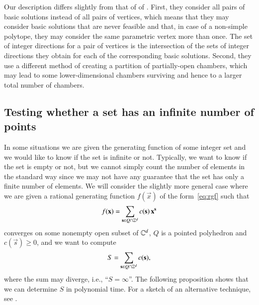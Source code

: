 Our description differs slightly from that of
of .
First, they consider all pairs of basic solutions instead
of all pairs of vertices, which means that they may
consider basic solutions that are never feasible and that,
in case of a non-simple polytope,
they may consider the same parametric vertex more than once.
The set of integer
directions for a pair of vertices is the intersection of
the sets of integer directions they obtain for each of
the corresponding basic solutions.
Second, they use a different method of creating a partition
of partially-open chambers, which may lead to some lower-dimensional
chambers surviving and hence to a larger total number of chambers.


\subsection{Testing whether a set has an infinite number of points}
\label{s:infinite}

In some situations we are given the generating function of
some integer set and we would like to know if the set is
infinite or not.  Typically, we want to know if the set
is empty or not, but we cannot simply count the number of elements
in the standard way since we may not have any guarantee that
the set has only a finite number of elements.
We will consider the slightly more general case where we are
given a rational generating function $f(\vec x)$ of the form~\eqref{eq:rgf}
such that
\begin{equation}
\label{eq:rgf:psp}
f(\vec x) = \sum_{\vec s \in Q \cap \ZZ^d} c(\vec s)\, \vec x^{\vec s}
\end{equation}
converges on some nonempty open subset of $\mathbb{C}^d$, $Q$ is a pointed
polyhedron and $c(\vec s) \ge 0$,
and we want to compute
\begin{equation}
\label{eq:psp:sum}
S = \sum_{\vec s \in Q \cap \ZZ^d} c(\vec s)
,
\end{equation}
where the sum may diverge, i.e., ``$S = \infty$''.
The following proposition shows that we can determine $S$
in polynomial time.
For a sketch of an alternative technique, see
.


